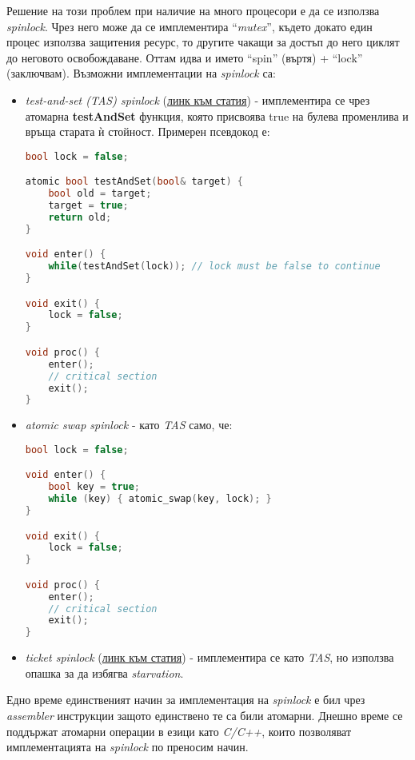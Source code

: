 \documentclass[fleqn,12pt]{article}
\begin{document}
Решение на този проблем при наличие на много процесори е да се използва \textit{spinlock}.
Чрез него може да се имплементира ``\textit{mutex}'', където докато един процес използва защитения ресурс, то другите чакащи за достъп до него циклят до неговото освобождаване.
Оттам идва и името ``spin'' (въртя) + ``lock'' (заключвам).
\bigbreak
Възможни имплементации на \textit{spinlock} са:
\begin{itemize}
    \item \textit{test-and-set (TAS) spinlock} (\href{https://geidav.wordpress.com/2016/03/23/test-and-set-spinlocks/}{линк към статия}) - имплементира се чрез атомарна \textbf{testAndSet} функция, която присвоява true на булева променлива и връща старата ѝ стойност. Примерен псевдокод е: \\
    \begin{lstlisting}[language=C++, caption=TAS]
bool lock = false;

atomic bool testAndSet(bool& target) {
    bool old = target;
    target = true;
    return old;
}

void enter() {
    while(testAndSet(lock)); // lock must be false to continue
}

void exit() {
    lock = false;
}

void proc() {
    enter();
    // critical section
    exit();
}
    \end{lstlisting}
    \item \textit{atomic swap spinlock} - като \textit{TAS} само, че:
    \begin{lstlisting}[language=C++, caption=Atomic swap]
bool lock = false;

void enter() {
    bool key = true;
    while (key) { atomic_swap(key, lock); }
}

void exit() {
    lock = false;
}

void proc() {
    enter();
    // critical section
    exit();
}
    \end{lstlisting}
    \item \textit{ticket spinlock} (\href{https://geidav.wordpress.com/2016/04/09/the-ticket-spinlock/}{линк към статия}) - имплементира се като \textit{TAS}, но използва опашка за да избягва \textit{starvation}.

\end{itemize}

Едно време единственият начин за имплементация на \textit{spinlock} е бил чрез \textit{assembler} инструкции защото единствено те са били атомарни.
Днешно време се поддържат атомарни операции в езици като \textit{C/C++}, които позволяват имплементацията на \textit{spinlock} по преносим начин.
\end{document}
